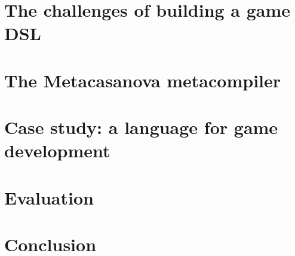 \documentclass[lnicst]{svmultln}
\begin{document}
\section{The challenges of building a game DSL}
\label{sec:problem_statement}



\vspace{-0.6cm}
\section{The Metacasanova metacompiler}
\label{sec:formal_description}


\vspace{-0.6cm}
\section{Case study: a language for game development}
\label{sec:casanova3}



\section{Evaluation}
\label{sec:evaluation}


\vspace{-1.2cm}
\section{Conclusion}
\label{sec:future_works}



%
%


\vspace{-0.75cm}


%
\end{document}
